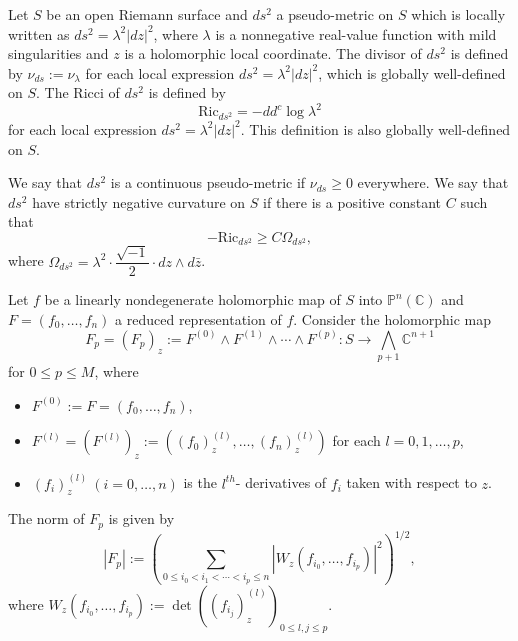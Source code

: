\documentclass[12pt,article]{amsart}
\newcommand{\C}{{\mathbb{C}}}
\renewcommand{\P}{{\mathbb{P}}}
\numberwithin{equation}{section}
\begin{document}
Let $S$ be an open Riemann surface and $ds^2$ a pseudo-metric on $S$ which is locally written as $ds^2=\lambda^2|dz|^2$, where $\lambda$ is a nonnegative real-value function with mild singularities and $z$ is a holomorphic local coordinate. The divisor of $ds^2$ is defined by $\nu_{ds}:=\nu_\lambda$ for each local expression $ds^2=\lambda^2|dz|^2$, which is globally well-defined on $S$. 
The Ricci of  $ds^2$ is defined by 
$$ \mathrm{Ric}_{ds^2}=-dd^c\log\lambda^2$$
for each local expression  $ds^2=\lambda^2|dz|^2$. This definition is also globally well-defined on $S$.

We say that $ds^2$ is a continuous pseudo-metric if $\nu_{ds}\ge 0$ everywhere. We say that $ds^2$ have strictly negative curvature on $S$ if there is a positive constant $C$ such that
$$ -\mathrm{Ric}_{ds^2}\ge C\Omega_{ds^2}, $$
where $\Omega_{ds^2}=\lambda^2\cdot\dfrac{\sqrt{-1}}{2}\cdot dz\wedge d\bar z$.

Let $f$ be a linearly nondegenerate holomorphic map of $S$ into $\P^n(\C)$ and $F=(f_0,\ldots,f_n)$ a reduced representation of $f$. 
Consider the holomorphic map
$$F_{p} = (F_{p})_z := F^{(0)} \wedge F^{(1)} \wedge \cdots \wedge F^{(p)} : S\rightarrow \bigwedge_{p+1}\C^{n+1}$$
for $0\le p\le M$, where 
\begin{itemize}
\item $F^{(0)}:=F=(f_0,\ldots,f_n)$,
\item $F^{(l)}=(F^{(l)})_z:=\left ((f_0)^{(l)}_z,\ldots,(f_n)^{(l)}_z\right)$ for each $l=0, 1,\ldots , p$,
\item $(f_i)^{(l)}_z \ (i =0,\ldots, n)$ is the $l^{th}$- derivatives of $f_i$ taken with respect to $z$.
\end{itemize}
The norm of $F_{p}$ is given by
$$|F_{p}|:=\left (\sum_{0\le i_0<i_1<\cdots<i_p\le n}\left |W_z(f_{i_0},\ldots,f_{i_p})\right|^2\right)^{1/2}, $$
where $W_z(f_{i_0},\ldots,f_{i_p}):=\det\left ((f_{i_j})^{(l)}_z\right)_{0\le l,j\le p}$.  
\end{document}
